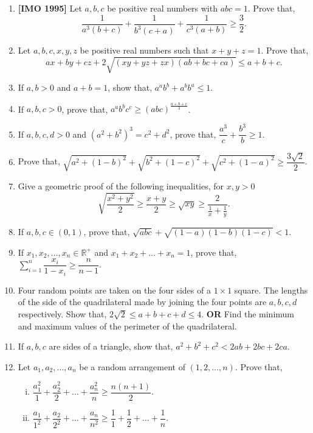 \documentclass[11pt, a4paper]{article}
\begin{document}
\begin{enumerate}
	\item \textbf{[IMO 1995]} Let $a, b, c$ be positive real numbers with $abc  = 1$. Prove that, $$\dfrac{1}{a^3(b+c)} + \dfrac{1}{b^3(c+a)} + \dfrac{1}{c^3(a+b)} \geq \dfrac{3}{2}.$$
	
	\item Let $a, b, c, x, y, z$ be positive real numbers such that $x + y + z = 1$. Prove that, $$ax + by + cz + 2\sqrt{(xy+yz+zx)(ab+bc+ca)} \leq a+b+c.$$
	
	\item If $a, b > 0$ and $a+b=1$, show that, $a^ab^b + a^bb^a \leq 1$.
	
	\item If $a, b, c > 0$, prove that, $a^a b^b c^c \geq (abc)^{\frac{a+b+c}{3}}$.
	
	\item If $a, b, c, d > 0$ and $(a^2 + b^2)^3 = c^2 + d^2$, prove that, $\dfrac{a^3}{c} + \dfrac{b^3}{b} \geq 1$.
	
	\item Prove that, $\sqrt{a^2 + (1-b)^2} + \sqrt{b^2 + (1-c)^2} + \sqrt{c^2 + (1-a)^2} \geq \dfrac{3\sqrt{2}}{2}$.
	
	\item Give a geometric proof of the following inequalities, for $x, y > 0$ $$\sqrt{\dfrac{x^2+y^2}{2}} \geq \dfrac{x+y}{2} \geq \sqrt{xy} \geq \dfrac{2}{\frac{1}{x} + \frac{1}{y}}.$$

	\item If $a, b, c \in (0, 1)$, prove that, $\sqrt{abc} + \sqrt{(1-a)(1-b)(1-c)} < 1$.
	
	\item If $x_1, x_2, \ldots , x_n \in \mathbb{R^+}$ and $x_1 + x_2 + \ldots + x_n = 1$, prove that, $\sum \limits_{i = 1}^{n} \dfrac{x_i}{1-x_i} \geq \dfrac{n}{n-1}$.
	
	\item Four random points are taken on the four sides of a $1 \times 1$ square. The lengths of the side of the quadrilateral made by joining the four points are $a, b, c, d$ respectively. Show that, $2\sqrt{2} \leq a+b+c+d \leq 4$. \textbf{OR} Find the minimum and maximum values of the perimeter of the quadrilateral.
	
	\item If $a, b, c$ are sides of a triangle, show that, $a^2 + b^2 + c^2 < 2ab + 2bc + 2ca$.
	
	\item Let $a_1, a_2, \ldots, a_n$ be a random arrangement of $(1, 2, \ldots, n)$. Prove that, 
	\begin{enumerate}[(i)]
		\item $\dfrac{a_1^2}{1} + \dfrac{a_2^2}{2} + \ldots + \dfrac{a_n^2}{n} \geq \dfrac{n(n+1)}{2}$.
		\item $\dfrac{a_1}{1^2} + \dfrac{a_2}{2^2} + \ldots + \dfrac{a_n}{n^2} \geq \dfrac{1}{1} + \dfrac{1}{2} + \ldots + \dfrac{1}{n}$.
	

\end{enumerate}
\end{enumerate}
\end{document}
